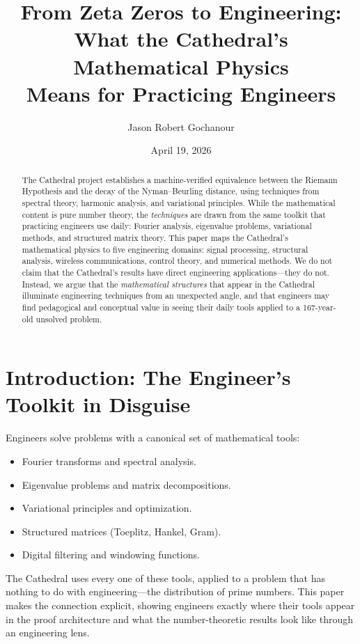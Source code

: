 \documentclass[11pt,a4paper]{article}
\title{%
  From Zeta Zeros to Engineering:\\
  What the Cathedral's Mathematical Physics\\
  Means for Practicing Engineers%
}
\author{
  Jason Robert Gochanour
}
\date{April 19, 2026}
\begin{document}
\maketitle

\begin{abstract}
The Cathedral project establishes a machine-verified equivalence
between the Riemann Hypothesis and the decay of the Nyman--Beurling
distance, using techniques from spectral theory, harmonic analysis,
and variational principles. While the mathematical content is pure
number theory, the \emph{techniques} are drawn from the same toolkit
that practicing engineers use daily: Fourier analysis, eigenvalue
problems, variational methods, and structured matrix theory. This
paper maps the Cathedral's mathematical physics to five engineering
domains: signal processing, structural analysis, wireless
communications, control theory, and numerical methods. We do not
claim that the Cathedral's results have direct engineering
applications---they do not. Instead, we argue that the
\emph{mathematical structures} that appear in the Cathedral
illuminate engineering techniques from an unexpected angle, and
that engineers may find pedagogical and conceptual value in seeing
their daily tools applied to a 167-year-old unsolved problem.
\end{abstract}

\tableofcontents

\section{Introduction: The Engineer's Toolkit in Disguise}

Engineers solve problems with a canonical set of mathematical tools:

\begin{itemize}
  \item Fourier transforms and spectral analysis.
  \item Eigenvalue problems and matrix decompositions.
  \item Variational principles and optimization.
  \item Structured matrices (Toeplitz, Hankel, Gram).
  \item Digital filtering and windowing functions.
\end{itemize}

The Cathedral uses every one of these tools, applied to a problem
that has nothing to do with engineering---the distribution of prime
numbers. This paper makes the connection explicit, showing engineers
exactly where their tools appear in the proof architecture and what
the number-theoretic results look like through an engineering lens.
\end{document}
